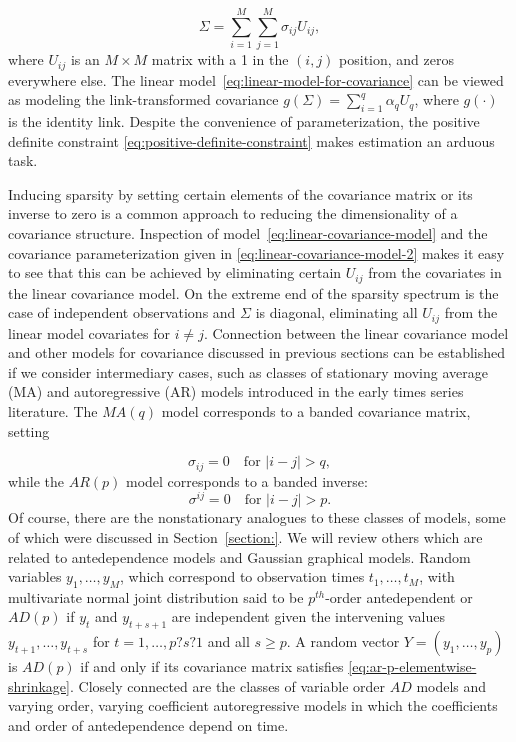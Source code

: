 \documentclass[12pt]{article}
\theoremstyle{definition}
\begin{document}
\begin{equation} \label{eq:linear-covariance-model-2}
\Sigma = \sum_{i = 1}^M \sum_{j = 1}^M \sigma_{ij} U_{ij},
\end{equation}
\noindent
where $U_{ij}$ is an $M \times M$ matrix with a 1 in the $\left(i,j\right)$ position, and zeros everywhere else. The linear model~\ref{eq:linear-model-for-covariance} can be viewed as modeling the link-transformed covariance $g\left(\Sigma\right) =\sum_{i = 1}^q \alpha_qU_q$, where $g\left(\cdot\right)$ is the identity link. Despite the convenience of parameterization, the positive definite constraint \ref{eq:positive-definite-constraint} makes estimation an arduous task. 

\bigskip

Inducing sparsity by setting certain elements of the covariance matrix or its inverse to zero is a common approach to reducing the dimensionality of a covariance structure. Inspection of model~\ref{eq:linear-covariance-model} and the covariance parameterization given in \ref{eq:linear-covariance-model-2} makes it easy to see that this can be achieved by eliminating certain $U_{ij}$ from the covariates in the linear covariance model. On the extreme end of the sparsity spectrum is the case of independent observations and $\Sigma$ is diagonal, eliminating all $U_{ij}$ from the linear model covariates for $i \ne j$. Connection between the linear covariance model and other models for covariance discussed in previous sections can be established if we consider intermediary cases, such as classes of stationary moving average (MA) and autoregressive (AR) models introduced in the early times series literature. The $MA(q)$ model corresponds to a banded covariance matrix, setting 

\begin{equation}  \label{eq:ar-p-elementwise-shrinkage}
\sigma_{ij} = 0 \quad \mbox{for }\vert i - j \vert > q, 
\end{equation}
\noindent
while the $AR(p)$ model corresponds to a banded inverse:
\begin{equation} \label{eq:ar-p-elementwise-shrinkage}
\sigma^{ij} = 0 \quad \mbox{for }\vert i - j \vert > p. 
\end{equation}
Of course, there are the nonstationary analogues to these classes of models, some of which were discussed in Section~\ref{section:}. We will review others which are related to antedependence models and Gaussian graphical models. Random variables $y_1, \dots, y_M$, which correspond to observation times $t_1,\dots, t_M$, with multivariate normal joint distribution said to be $p^{th}$-order antedependent or $AD(p)$ \citet{gabriel1962ante} if $y_t$ and $y_{t+s+1}$ are independent given the intervening values $y_{t+1}, \dots , y_{t+s}$ for $t = 1, \dots , p?s?1$ and all $s \ge p$. A random vector $Y = \left(y_1, \dots , y_p\right)$ is $AD(p)$ if and only if its covariance matrix satisfies \ref{eq:ar-p-elementwise-shrinkage}. Closely connected are the classes of variable order $AD$ models and varying order, varying coefficient autoregressive models \citet{kitagawa1985smoothness} in which the coefficients and order of antedependence depend on time. 
\end{document}
